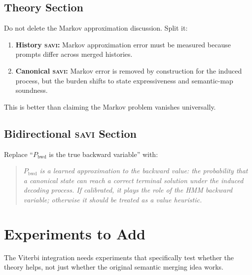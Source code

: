\documentclass[11pt,letterpaper]{article}
\newcommand{\Pbwd}{P_{\mathrm{bwd}}}
\newcommand{\SAVI}{\textsc{savi}\xspace}
\begin{document}
\subsection{Theory Section}

Do not delete the Markov approximation discussion.
Split it:

\begin{enumerate}
  \item \textbf{History \SAVI:} Markov approximation error must be measured because prompts differ
        across merged histories.
  \item \textbf{Canonical \SAVI:} Markov error is removed by construction for the induced process,
        but the burden shifts to state expressiveness and semantic-map soundness.
\end{enumerate}

This is better than claiming the Markov problem vanishes universally.

\subsection{Bidirectional \SAVI Section}

Replace ``$\Pbwd$ is the true backward variable'' with:

\begin{quote}
\itshape
$\Pbwd$ is a learned approximation to the backward value: the probability that a canonical state can
reach a correct terminal solution under the induced decoding process.
If calibrated, it plays the role of the HMM backward variable; otherwise it should be treated as a
value heuristic.
\end{quote}

\section{Experiments to Add}

The Viterbi integration needs experiments that specifically test whether the theory helps, not just
whether the original semantic merging idea works.
\end{document}
